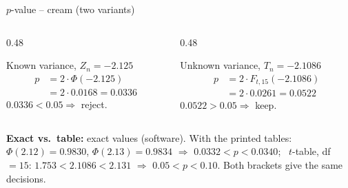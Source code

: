 \documentclass[aspectratio=169,11pt]{beamer}
\begin{document}
\begin{frame}{$p$-value -- cream (two variants)}
  \begin{columns}[T]
    \begin{column}{0.48\textwidth}
      \begin{block}{Known variance, $Z_n=-2.125$}
        \begin{align*}
          p &= 2\cdot\Phi(-2.125)\\
            &= 2\cdot 0.0168 = \mathbf{0.0336}
        \end{align*}
        $0.0336 < 0.05 \Rightarrow$ reject.
      \end{block}
    \end{column}
    \begin{column}{0.48\textwidth}
      \begin{block}{Unknown variance, $T_n=-2.1086$}
        \begin{align*}
          p &= 2\cdot F_{t,15}(-2.1086)\\
            &= 2\cdot 0.0261 = \mathbf{0.0522}
        \end{align*}
        $0.0522 > 0.05 \Rightarrow$ keep.
      \end{block}
    \end{column}
  \end{columns}
  \footnotesize\textbf{Exact vs.\ table:} exact values (software). With the
  printed tables: $\Phi(2.12)=0.9830$, $\Phi(2.13)=0.9834$ $\Rightarrow$
  $0.0332<p<0.0340$; \ $t$-table, df $=15$: $1.753<2.1086<2.131$
  $\Rightarrow$ $0.05<p<0.10$. Both brackets give the same decisions.
\end{frame}
\end{document}
